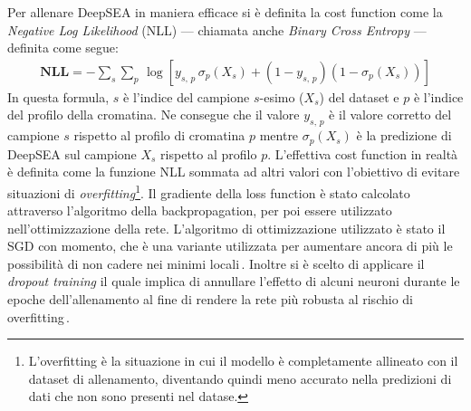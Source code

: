 Per allenare DeepSEA in maniera efficace si è definita la cost function come la \textit{Negative Log Likelihood} (\acs{NLL}) — chiamata anche \textit{Binary Cross Entropy} — definita come segue:
% 
\begin{gather*}
    \mathbf{NLL} = - \sum_s \sum_p\, \log\left[ y_{s,\,p}\,\sigma_p\left(X_s\right)  + \left( 1- y_{s,\,p} \right)\left(1 - \sigma_p\left(X_s\right) \right) \right]
\end{gather*}
% 
\noindent In questa formula, $s$ è l'indice del campione $s$-esimo ($X_s$) del dataset e $p$ è l'indice del profilo della cromatina. Ne consegue che il valore $y_{s,\,p}$ è il valore corretto del campione $s$ rispetto al profilo di cromatina $p$ mentre $\sigma_p\left(X_s\right)$ è la predizione di DeepSEA sul campione $X_s$ rispetto al profilo $p$. L'effettiva cost function in realtà è definita come la funzione \acs{NLL} sommata ad altri valori con l'obiettivo di evitare situazioni di \textit{overfitting}\footnote{L'overfitting è la situazione in cui il modello è completamente allineato con il dataset di allenamento, diventando quindi meno accurato nella predizioni di dati che non sono presenti nel datase.}. Il gradiente della loss function è stato calcolato attraverso l'algoritmo della backpropagation, per poi essere utilizzato nell'ottimizzazione della rete. L'algoritmo di ottimizzazione utilizzato è stato il \acs{SGD} con momento, che è una variante utilizzata per aumentare ancora di più le possibilità di non cadere nei minimi locali\,\cite{aggarwal2018neural}. Inoltre si è scelto di applicare il \textit{dropout training} il quale implica di annullare l'effetto di alcuni neuroni durante le epoche dell'allenamento al fine di rendere la rete più robusta al rischio di overfitting\,\cite{nielsen2015neural}.



